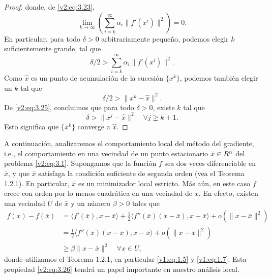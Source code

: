 \begin{proof}
    donde, de \eqref{v2:eq:3.23},
    \[
        \lim_{k \to \infty} \left( \sum_{i=k}^\infty \alpha_i \|f'(x^i)\|^2 \right) = 0.
    \]
    En particular, para todo $\delta > 0$ arbitrariamente pequeño, podemos elegir $k$ suficientemente grande, tal que
    \[
        \delta/2 > \sum_{i=k}^\infty \alpha_i \|f'(x^i)\|^2.
    \]
    Como $\hat{x}$ es un punto de acumulación de la sucesión $\{x^k\}$, podemos también elegir un $k$ tal que
    \[
        \delta/2 > \|x^k - \hat{x}\|^2.
    \]
    De \eqref{v2:eq:3.25}, concluimos que para todo $\delta > 0$, existe $k$ tal que
    \[
        \delta > \|x^j - \hat{x}\|^2 \quad \forall j \ge k+1.
    \]
    Esto significa que $\{x^k\}$ converge a $\hat{x}$.
\end{proof}

A continuación, analizaremos el comportamiento local del método del gradiente, i.e., el comportamiento en una vecindad de un punto estacionario $\bar{x} \in R^n$ del problema \eqref{v2:eq:3.1}. Supongamos que la función $f$ sea dos veces diferenciable en $\bar{x}$, y que $\bar{x}$ satisfaga la condición suficiente de segunda orden (vea el Teorema 1.2.1).
En particular, $\bar{x}$ es un minimizador local estricto. Más aún, en este caso $f$ crece con orden por lo menos cuadrática en una vecindad de $\bar{x}$. En efecto, existen una vecindad $U$ de $\bar{x}$ y un número $\beta > 0$ tales que
\begin{align}
    f(x) - f(\bar{x}) &= \langle f'(\bar{x}), x - \bar{x} \rangle + \frac{1}{2} \langle f''(\bar{x})(x - \bar{x}), x - \bar{x} \rangle + o(\|x - \bar{x}\|^2) \nonumber \\
    &= \frac{1}{2} \langle f''(\bar{x})(x - \bar{x}), x - \bar{x} \rangle + o(\|x - \bar{x}\|^2) \nonumber \\
    &\ge \beta \|x - \bar{x}\|^2 \quad \forall x \in U,
    \label{v2:eq:3.26}
\end{align}
donde utilizamos el Teorema 1.2.1, en particular \eqref{v1:eq:1.5} y \eqref{v1:eq:1.7}. Esta propiedad \eqref{v2:eq:3.26} tendrá un papel importante en nuestro análisis local.

